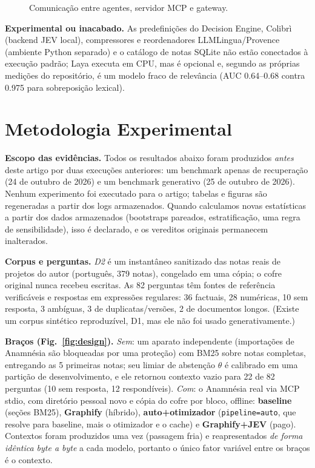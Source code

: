 \documentclass[conference,onecolumn,11pt]{IEEEtran}
\newcommand{\anam}{Anam\-n\'esia}
\begin{document}
\begin{figure}[!htbp]\centering
{}
\caption{Comunicação entre agentes, servidor MCP e gateway.}\label{fig:agents}
\end{figure}

\textbf{Experimental ou inacabado.} As predefinições do Decision Engine, Colibr\`i (backend JEV local), compressores e reordenadores LLMLingua/Provence (ambiente Python separado) e o catálogo de notas SQLite não estão conectados à execução padrão; Laya executa em CPU, mas é opcional e, segundo as próprias medições do repositório, é um modelo fraco de relevância (AUC 0.64--0.68 contra 0.975 para sobreposição lexical).

\FloatBarrier
\section{Metodologia Experimental}\label{sec:method}
\textbf{Escopo das evidências.} Todos os resultados abaixo foram produzidos \emph{antes} deste artigo por duas execuções anteriores: um benchmark apenas de recuperação (24 de outubro de 2026) e um benchmark generativo (25 de outubro de 2026). Nenhum experimento foi executado para o artigo; tabelas e figuras são regeneradas a partir dos logs armazenados. Quando calculamos novas estatísticas a partir dos dados armazenados (bootstraps pareados, estratificação, uma regra de sensibilidade), isso é declarado, e os vereditos originais permanecem inalterados.

\textbf{Corpus e perguntas.} \emph{D2} é um instantâneo sanitizado das notas reais de projetos do autor (português, 379 notas), congelado em uma cópia; o cofre original nunca recebeu escritas. As 82 perguntas têm fontes de referência verificáveis e respostas em expressões regulares: 36 factuais, 28 numéricas, 10 sem resposta, 3 ambíguas, 3 de duplicatas/versões, 2 de documentos longos. (Existe um corpus sintético reproduzível, D1, mas ele não foi usado generativamente.)

\textbf{Braços (Fig.~\ref{fig:design}).} \emph{Sem}: um aparato independente (importações de \anam{} são bloqueadas por uma proteção) com BM25 sobre notas completas, entregando as 5 primeiras notas; seu limiar de abstenção $\theta$ é calibrado em uma partição de desenvolvimento, e ele retornou contexto vazio para 22 de 82 perguntas (10 sem resposta, 12 respondíveis). \emph{Com}: o \anam{} real via MCP stdio, com diretório pessoal novo e cópia do cofre por bloco, offline: \textbf{baseline} (seções BM25), \textbf{Graphify} (híbrido), \textbf{auto+otimizador} (\texttt{pipeline=auto}, que resolve para baseline, mais o otimizador e o cache) e \textbf{Graphify+JEV} (pago). Contextos foram produzidos uma vez (passagem fria) e reapresentados \emph{de forma idêntica byte a byte} a cada modelo, portanto o único fator variável entre os braços é o contexto.
\end{document}
